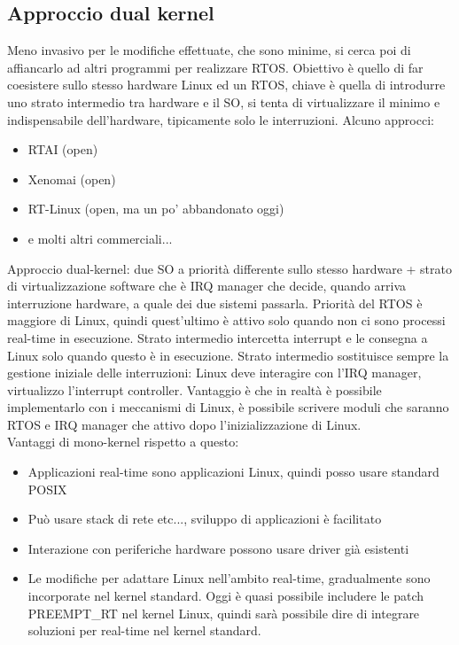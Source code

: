 \documentclass[12pt, oneside]{extbook}
\begin{document}
\subsection{Approccio dual kernel}
Meno invasivo per le modifiche effettuate, che sono minime, si cerca poi di affiancarlo ad altri programmi per realizzare RTOS. Obiettivo è quello di far coesistere sullo stesso hardware Linux ed un RTOS, chiave è quella di introdurre uno strato intermedio tra hardware e il SO, si tenta di virtualizzare il minimo e indispensabile dell'hardware, tipicamente solo le interruzioni. Alcuno approcci:
\begin{itemize}
\item RTAI (open)
\item Xenomai (open)
\item RT-Linux (open, ma un po' abbandonato oggi)
\item e molti altri commerciali...
\end{itemize}
Approccio dual-kernel: due SO a priorità differente sullo stesso hardware +  strato di virtualizzazione software che è IRQ manager che decide, quando arriva interruzione hardware, a quale dei due sistemi passarla. Priorità del RTOS è maggiore di Linux, quindi quest'ultimo è attivo solo quando non ci sono processi real-time in esecuzione. Strato intermedio intercetta interrupt e le consegna a Linux solo quando questo è in esecuzione. Strato intermedio sostituisce sempre la gestione iniziale delle interruzioni: Linux deve interagire con l'IRQ manager, virtualizzo l'interrupt controller. Vantaggio è che in realtà è possibile implementarlo con i meccanismi di Linux, è possibile scrivere moduli che saranno RTOS e IRQ manager che attivo dopo l'inizializzazione di Linux.\\ Vantaggi di mono-kernel rispetto a questo:
\begin{itemize}
\item Applicazioni real-time sono applicazioni Linux, quindi posso usare standard POSIX
\item Può usare stack di rete etc..., sviluppo di applicazioni è facilitato
\item Interazione con periferiche hardware possono usare driver già esistenti
\item Le modifiche per adattare Linux nell'ambito real-time, gradualmente sono incorporate nel kernel standard. Oggi è quasi possibile includere le patch PREEMPT\_RT nel kernel Linux, quindi sarà possibile dire di integrare soluzioni per real-time nel kernel standard.
\end{itemize}
\end{document}
